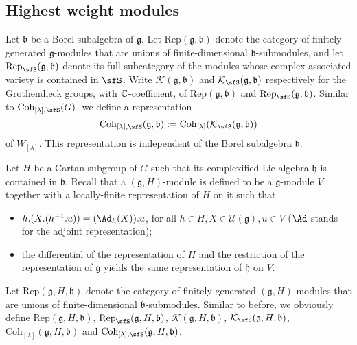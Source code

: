\documentclass[12pt,a4paper]{amsart}
\newcommand{\CK}{{\mathcal {K}}}
\newcommand{\CU}{{\mathcal {U}}}
\newcommand{\g}{\mathfrak g}
\newcommand{\h}{\mathfrak h}
\renewcommand{\b}{\mathfrak b}
\numberwithin{equation}{section}
\theoremstyle{remark}
\def\Irr{\mathrm{Irr}}
\def\Coh{\mathrm{Coh}}
\newcommand{\Lam}{{[\lambda]}}
\begin{document}
\subsection{Highest weight modules}

\newcommand{\Rep}{\mathrm{Rep}}
Let $\b$ be a  Borel subalgebra of $\g$. Let $\Rep(\g,\b)$ denote the category of finitely generated $\g$-modules that are unions of finite-dimensional $\b$-submodules, and  let $\Rep_\sfS(\g,\b)$ denote its full subcategory of the modules whose complex associated variety is contained in $\sfS$.
Write $\CK(\g,\b)$ and $\CK_\sfS(\g,\b)$ respectively for the Grothendieck groups, with $\mathbb{C}$-coefficient, of $\Rep(\g,\b)$  and $\Rep_\sfS(\g,\b)$.  %
Similar to $\Coh_{\Lam,\sfS}(G)$, we define a representation
\[
\Coh_{\Lam,\sfS}(\g,\b):=\Coh_{\Lam}(\CK_\sfS(\g,\b))
\]
 of $W_{[\lambda]}$. This  representation  is independent of the Borel subalgebra $\b$.


    Let $H$ be a Cartan subgroup of $G$ such that its complexified Lie algebra $\h$ is contained in $\b$. Recall that a $(\g, H)$-module is defined to be a $\g$-module $V$ together with a locally-finite representation of $H$ on it such that
     \begin{itemize}
     \item
        $h.(X.(h^{-1}.u))=(\Ad_h(X)).u$, for all $h\in H, X\in \CU(\g), u\in V$ ($\Ad$ stands for the adjoint representation);
        \item the differential of the representation of $H$ and the restriction of the representation of $\g$ yields the same representation of $\h$ on $V$.
     \end{itemize}

Let $\Rep(\g,H,\b)$ denote the category of finitely generated $(\g, H)$-modules that  are unions of finite-dimensional $\b$-submodules.
Similar to before, we obviously define $\Rep(\g,H,\b)$, $\Rep_\sfS(\g,H,\b)$, $\CK(\g,H, \b)$, $\CK_\sfS(\g,H, \b)$, $\Coh_{\Lam}(\g,H, \b)$ and  $\Coh_{\Lam,\sfS}(\g,H, \b)$.
\end{document}
